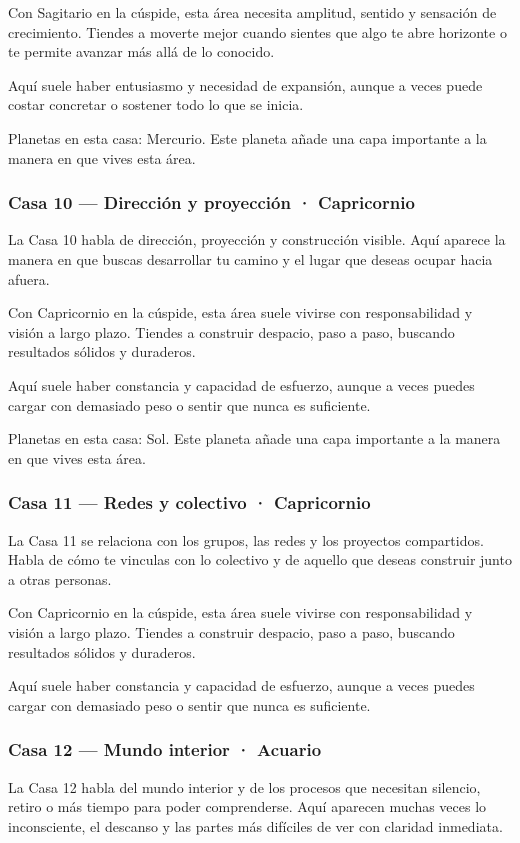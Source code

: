 \documentclass[11pt,a4paper]{article}
\begin{document}
Con Sagitario en la cúspide, esta área necesita amplitud, sentido y sensación de crecimiento. Tiendes a moverte mejor cuando sientes que algo te abre horizonte o te permite avanzar más allá de lo conocido.

Aquí suele haber entusiasmo y necesidad de expansión, aunque a veces puede costar concretar o sostener todo lo que se inicia.

Planetas en esta casa: Mercurio. Este planeta añade una capa importante a la manera en que vives esta área.

\subsubsection*{Casa 10 — Dirección y proyección · Capricornio}
La Casa 10 habla de dirección, proyección y construcción visible. Aquí aparece la manera en que buscas desarrollar tu camino y el lugar que deseas ocupar hacia afuera.

Con Capricornio en la cúspide, esta área suele vivirse con responsabilidad y visión a largo plazo. Tiendes a construir despacio, paso a paso, buscando resultados sólidos y duraderos.

Aquí suele haber constancia y capacidad de esfuerzo, aunque a veces puedes cargar con demasiado peso o sentir que nunca es suficiente.

Planetas en esta casa: Sol. Este planeta añade una capa importante a la manera en que vives esta área.

\subsubsection*{Casa 11 — Redes y colectivo · Capricornio}
La Casa 11 se relaciona con los grupos, las redes y los proyectos compartidos. Habla de cómo te vinculas con lo colectivo y de aquello que deseas construir junto a otras personas.

Con Capricornio en la cúspide, esta área suele vivirse con responsabilidad y visión a largo plazo. Tiendes a construir despacio, paso a paso, buscando resultados sólidos y duraderos.

Aquí suele haber constancia y capacidad de esfuerzo, aunque a veces puedes cargar con demasiado peso o sentir que nunca es suficiente.

\subsubsection*{Casa 12 — Mundo interior · Acuario}
La Casa 12 habla del mundo interior y de los procesos que necesitan silencio, retiro o más tiempo para poder comprenderse. Aquí aparecen muchas veces lo inconsciente, el descanso y las partes más difíciles de ver con claridad inmediata.
\end{document}
